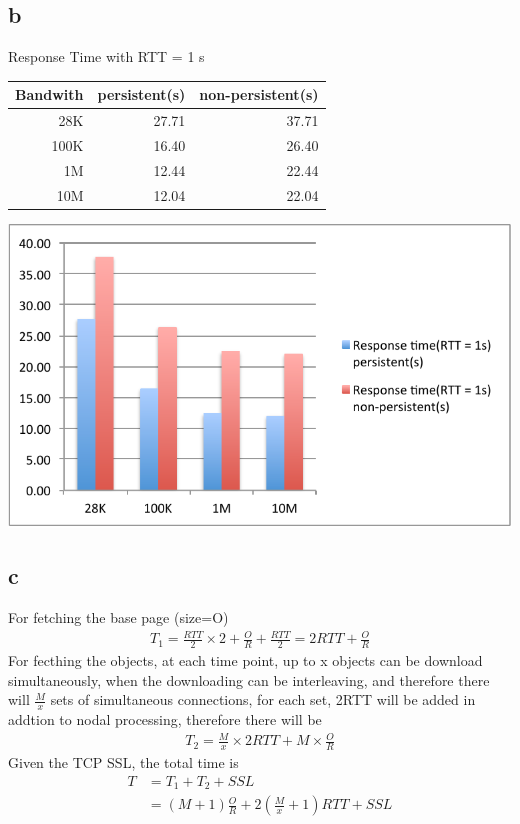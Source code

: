 \documentclass[a4paper, 11pt]{article}
\begin{document}
\subsection{b}
\begin{center}
Response Time with RTT = 1 s
\vspace{4mm} 

\begin{tabular}{|r|r|r|}
\hline
Bandwith & persistent(s) & non-persistent(s)\\ \hline
28K & 27.71 & 37.71\\ \hline
100K & 16.40 & 26.40\\ \hline
1M & 12.44 & 22.44\\ \hline
10M & 12.04 & 22.04\\ \hline
\end{tabular}
\vspace{4mm} 

\includegraphics{4b_chart.pdf}
\end{center}

\subsection{c}
For fetching the base page (size=O)
\begin{align}
	T_1 = \frac{RTT}{2} \times 2 + \frac{O}{R} + \frac{RTT}{2} = 2RTT + \frac{O}{R}
\end{align}
For fecthing the objects, at each time point, up to x objects can be download
simultaneously, when the downloading can be interleaving, and therefore there
will $\frac{M}{x}$ sets of simultaneous connections, for each set, 2RTT will be
added in addtion to nodal processing, therefore there will be 
\begin{align}
	T_2 = \frac{M}{x} \times 2RTT + M \times \frac{O}{R}
\end{align}
Given the TCP SSL, the total time is
\begin{align}
	T &= T_1 + T_2 + SSL \\
		&= (M + 1) \frac{O}{R} + 2 \left(\frac{M}{x} + 1 \right)RTT + SSL
\end{align}
\end{document}
